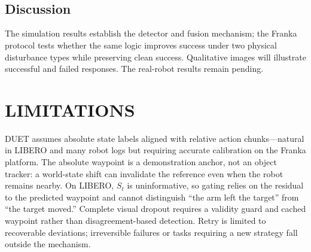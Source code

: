 \documentclass[letterpaper, 10 pt, conference]{ieeeconf}
\begin{document}
\begin{figure}[!t]
\begin{minipage}[t]{\columnwidth}
\hfill
{}\\[3mm]
\hfill
{}\\[3mm]
\hfill
{}
\label{fig:real_robot_mechanism}
\end{minipage}
\end{figure}
\fi

\subsection{Discussion}
The simulation results establish the detector and fusion mechanism; the Franka protocol tests whether the same logic improves success under two physical disturbance types while preserving clean success. Qualitative images will illustrate successful and failed responses. The real-robot results remain pending.

\section{LIMITATIONS}

DUET assumes absolute state labels aligned with relative action chunks---natural in LIBERO and many robot logs but requiring accurate calibration on the Franka platform. The absolute waypoint is a demonstration anchor, not an object tracker: a world-state shift can invalidate the reference even when the robot remains nearby. On LIBERO, $S_t$ is uninformative, so gating relies on the residual to the predicted waypoint and cannot distinguish ``the arm left the target'' from ``the target moved.'' Complete visual dropout requires a validity guard and cached waypoint rather than disagreement-based detection. Retry is limited to recoverable deviations; irreversible failures or tasks requiring a new strategy fall outside the mechanism.
\end{document}
